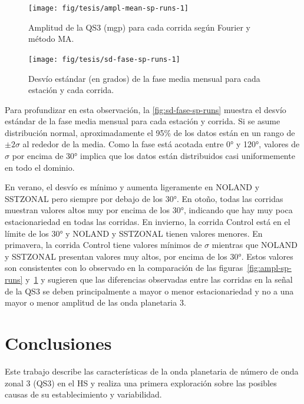 \documentclass[spanish,a4paper,12pt,oneside]{book}
\begin{document}
\begin{landscape}\begin{figure}

{\centering \texttt{[image: fig/tesis/ampl-mean-sp-runs-1]} 

}

\caption{Amplitud de la QS3 (mgp) para cada corrida según Fourier y método MA.}\label{fig:ampl-mean-sp-runs}
\end{figure}
\end{landscape}

\begin{figure}
\texttt{[image: fig/tesis/sd-fase-sp-runs-1]} \caption{Desvío estándar (en grados) de la fase media mensual para cada estación y cada corrida.}\label{fig:sd-fase-sp-runs}
\end{figure}

Para profundizar en esta observación, la \autoref{fig:sd-fase-sp-runs}
muestra el desvío estándar de la fase media mensual para cada estación y
corrida. Si se asume distribución normal, aproximadamente el 95\% de los
datos están en un rango de \(\pm 2\sigma\) al rededor de la media. Como
la fase está acotada entre 0° y 120°, valores de \(\sigma\) por encima
de 30° implica que los datos están distribuidos casi uniformemente en
todo el dominio.

En verano, el desvío es mínimo y aumenta ligeramente en NOLAND y
SSTZONAL pero siempre por debajo de los 30°. En otoño, todas las
corridas muestran valores altos muy por encima de los 30°, indicando que
hay muy poca estacionariedad en todas las corridas. En invierno, la
corrida Control está en el límite de los 30° y NOLAND y SSTZONAL tienen
valores menores. En primavera, la corrida Control tiene valores mínimos
de \(\sigma\) mientras que NOLAND y SSTZONAL presentan valores muy
altos, por encima de los 30°. Estos valores son consistentes con lo
observado en la comparación de las figuras~\ref{fig:ampl-sp-runs}
y~\ref{fig:ampl-mean-sp-runs} y sugieren que las diferencias observadas
entre las corridas en la señal de la QS3 se deben principalmente a mayor
o menor estacionariedad y no a una mayor o menor amplitud de las onda
planetaria 3.

\chapter{Conclusiones}\label{conclusiones}

Este trabajo describe las características de la onda planetaria de
número de onda zonal 3 (QS3) en el HS y realiza una primera exploración
sobre las posibles causas de su establecimiento y variabilidad.
\end{document}
